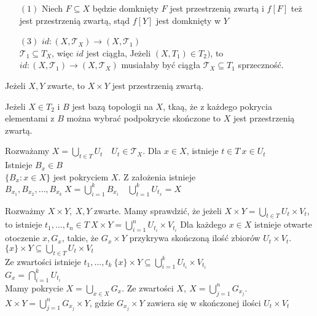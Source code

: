 \begin{dd} \hfill  
    \begin{itemize} 
        \item[$(1)$] Niech $F \subseteq X$ będzie domknięty $F$ jest przestrzenią zwartą i $f[F]$ też jest przestrzenią zwartą, stąd 
            $f[Y]$ jest domknięty w $Y$ 
        \item[$(3)$] $id: (X,\mathcal T_X) \to (X,\mathcal T_1)$ \\ 
            $\mathcal T_1 \subseteq T_X$, więc $id$ jest ciągła, Jeżeli $(X,T_1) \in T_2)$, to $id: (X,\mathcal T_1) \to (X,\mathcal T_X)$
            musiałaby być ciągła $\mathcal T_X \subseteq T_1$ sprzeczność.
    \end{itemize} 
\end{dd} 
\begin{tw} 
    Jeżeli $X, Y$ zwarte, to $X \times Y$ jest przestrzenią zwartą.
\end{tw} 
\begin{uw} 
    Jeżeli $X \in T_2$ i $B$ jest bazą topologii na $X$, tkaą, że z każdego pokrycia elementami z $B$ można wybrać podpokrycie skończone to $X$ 
    jest przestrzenią zwartą. 
\end{uw} 
\begin{dd} 
    Rozważamy $X = \bigcup\limits_{t \in T} U_t \quad U_t \in \mathcal T_X$. Dla $x \in X$, istnieje $t \in T \ x \in U_t$ \\ 
    Istnieje $B_x \in B$  \\ 
    $\{ B_x : x \in X \}$ jest pokryciem $X$. 
    Z założenia istnieje $B_{x_1}, B_{x_2}, \ldots,B_{x_k} \ X = \bigcup\limits_{i=1}^{k} B_{x_i} \quad \bigcup\limits_{t = 1}^k U_{t_x} = X$
\end{dd} 
\begin{dd} 
    Rozważmy $X \times Y,\ X, Y$ zwarte. 
    Mamy sprawdzić, że jeżeli $X \times Y = \bigcup\limits_{t \in T} U_t \times V_t$, to istnieje 
    $t_1,\ldots,t_n \in T \ X \times Y = \bigcup\limits_{i = 1}^n U_{t_i} \times V_{t_i}$ 
    Dla każdego $x \in X$ istnieje otwarte otoczenie $x, G_x$, takie, że $G_x \times Y$ przykrywa skończoną ilość 
    zbiorów $U_t \times V_t$. $\{x\} \times Y \subseteq \bigcup\limits_{t \in T} U_t \times V_t$ \\ 
    Ze zwartości istnieje $t_1,\ldots,t_k \ \{x\} \times Y \subseteq \bigcup\limits_{i=1}^k U_{t_i} \times V_{t_i}$ \\ 
    $G_x = \bigcap\limits_{i=1}^k U_{t_i}$ \\ 
    Mamy pokrycie $X = \bigcup\limits_{x \in X} G_x$. Ze zwartości $X,\ X = \bigcup\limits_{j=1}^n G_{x_j}$. 
    $X \times Y = \bigcup\limits_{j=1}^n G_{x_j} \times Y$, gdzie $G_{x_j} \times Y$ zawiera się w skończonej ilości 
    $U_t \times V_t$
\end{dd} 
